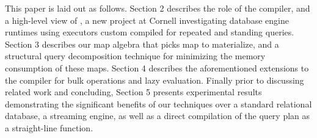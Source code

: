This paper is laid out as follows. Section 2 describes the role of the compiler,
and a high-level view of \compiler, a new project at Cornell investigating
database engine runtimes using executors custom compiled for repeated and
standing queries.
Section 3 describes our map algebra that picks map to materialize, and a
structural query decomposition technique for minimizing the memory consumption of
these maps. Section 4 describes the aforementioned extensions to the compiler
for bulk operations and lazy evaluation. Finally prior to discussing
related work and concluding, Section 5 presents experimental results
demonstrating the significant benefits of our techniques over a standard
relational database, a streaming engine, as well as a direct compilation of the
query plan as a straight-line function.






